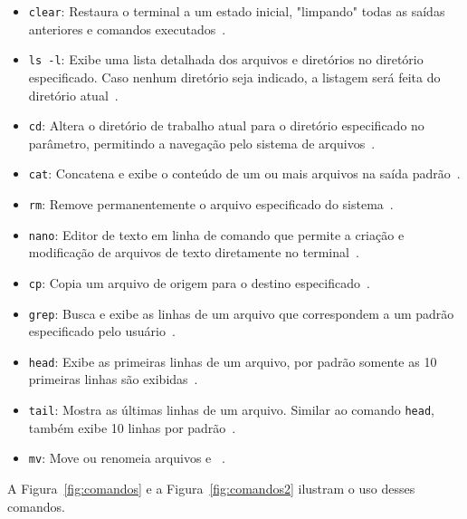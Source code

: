 \documentclass[
	12pt,				%
	oneside,   	        %
	a4paper,			%
	english,			%
	french,				%
	spanish,			%
	brazil,				%
	]{pacotes/abntex2}
\begin{document}
\begin{itemize}
    \item \texttt{clear}: Restaura o terminal a um estado inicial, "limpando" todas as saídas anteriores e comandos executados~\cite{manClear}.

    \item \texttt{ls -l}: Exibe uma lista detalhada dos arquivos e diretórios no diretório especificado. Caso nenhum diretório seja indicado, a listagem será feita do diretório atual~\cite{manLs}.

    \item \texttt{cd}: Altera o diretório de trabalho atual para o diretório especificado no parâmetro, permitindo a navegação pelo sistema de arquivos~\cite{manCd}.

    \item \texttt{cat}: Concatena e exibe o conteúdo de um ou mais arquivos na saída padrão~\cite{manCat}.

    \item \texttt{rm}: Remove permanentemente o arquivo especificado do sistema~\cite{manRm}.

    \item \texttt{nano}: Editor de texto em linha de comando que permite a criação e modificação de arquivos de texto diretamente no terminal~\cite{archNano}.

    \item \texttt{cp}: Copia um arquivo de origem para o destino especificado~\cite{manCp}.

    \item \texttt{grep}: Busca e exibe as linhas de um arquivo que correspondem a um padrão especificado pelo usuário~\cite{manGrep}.

    \item \texttt{head}: Exibe as primeiras linhas de um arquivo, por padrão somente as 10 primeiras linhas são exibidas~\cite{manHead}. 

    \item \texttt{tail}: Mostra as últimas linhas de um arquivo. Similar ao comando \texttt{head}, também exibe 10 linhas por padrão~\cite{manTail}.

    \item \texttt{mv}: Move ou renomeia arquivos e ~\cite{manMv}. 
\end{itemize}

A Figura~\ref{fig:comandos} e a Figura~\ref{fig:comandos2} ilustram o uso desses comandos.
\end{document}
